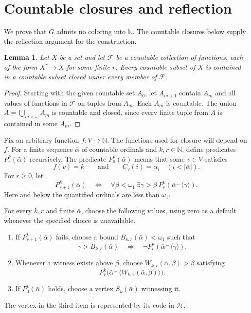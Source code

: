 \documentclass[11pt,leqno]{amsart}
\newtheorem{lemma}[theorem]{Lemma}
\theoremstyle{definition}
\numberwithin{equation}{section}
\newcommand{\N}{\mathbb N}
\newcommand{\HH}{\mathcal H}
\newcommand{\seq}[1]{\langle #1\rangle}
\newcommand{\cat}{\mathbin{{}^\frown}}
\begin{document}
\section{Countable closures and reflection}
We prove that $G$ admits no coloring into $\N$. The countable closures below supply the reflection argument for the construction.

\begin{lemma}\label{lem:closure}
Let $X$ be a set and let $\mathcal F$ be a countable collection of functions, each of the form $X^r\to X$ for some finite $r$. Every countable subset of $X$ is contained in a countable subset closed under every member of $\mathcal F$.
\end{lemma}

\begin{proof}
Starting with the given countable set $A_0$, let $A_{m+1}$ contain $A_m$ and all values of functions in $\mathcal F$ on tuples from $A_m$. Each $A_m$ is countable. The union $A=\bigcup_{m<\omega}A_m$ is countable and closed, since every finite tuple from $A$ is contained in some $A_m$.
\end{proof}

Fix an arbitrary function $f\colon V\to\N$. The functions used for closure will depend on $f$. For a finite sequence $\bar\alpha$ of countable ordinals and $k,r\in\N$, define predicates $P_r^k(\bar\alpha)$ recursively. The predicate $P_0^k(\bar\alpha)$ means that some $v\in V$ satisfies
\[
f(v)=k\qquad\text{and}\qquad
C_v(i)=\alpha_i\quad(i<|\bar\alpha|).
\]
For $r\ge0$, let
\begin{equation}\label{eq:prefix-recursion}
P_{r+1}^k(\bar\alpha)
\quad\Longleftrightarrow\quad
\forall\beta<\omega_1\ \exists\gamma>\beta\
P_r^k(\bar\alpha\cat\seq{\gamma}).
\end{equation}
Here and below the quantified ordinals are less than $\omega_1$.

For every $k,r$ and finite $\bar\alpha$, choose the following values, using zero as a default whenever the specified choice is unavailable.
\begin{enumerate}
\item If $P_{r+1}^k(\bar\alpha)$ fails, choose a bound $B_{k,r}(\bar\alpha)<\omega_1$ such that
\begin{equation}\label{eq:bound}
\gamma>B_{k,r}(\bar\alpha)
\quad\Longrightarrow\quad
\neg P_r^k(\bar\alpha\cat\seq{\gamma}).
\end{equation}
\item Whenever a witness exists above $\beta$, choose $W_{k,r}(\bar\alpha,\beta)>\beta$ satisfying
\[
P_r^k\bigl(\bar\alpha\cat\seq{W_{k,r}(\bar\alpha,\beta)}\bigr).
\]
\item If $P_0^k(\bar\alpha)$ holds, choose a vertex $S_k(\bar\alpha)$ witnessing it.
\end{enumerate}
The vertex in the third item is represented by its code in $\HH$.
\end{document}
